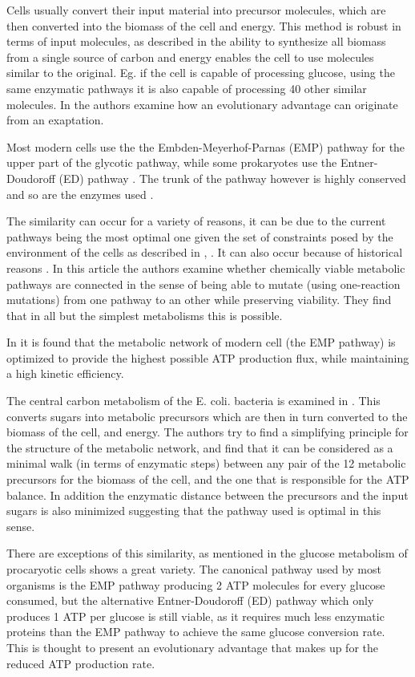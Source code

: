 \documentclass[10pt,a4paper]{article}
\begin{document}
	Cells usually convert their input material into precursor molecules, which are then converted into the biomass of the cell and energy. This method is robust in terms of input molecules, as described in \cite{latent} the ability to synthesize all biomass from a single source of carbon and energy enables the cell to use molecules similar to the original. Eg. if the cell is capable of processing glucose, using the same enzymatic pathways it is also capable of processing 40 other similar molecules.  In \cite{latent} the authors examine how an evolutionary advantage can originate from an exaptation. 
	
	  
	Most modern cells use the the Embden-Meyerhof-Parnas (EMP) pathway for the upper part of the glycotic  pathway, while some prokaryotes use the Entner-Doudoroff (ED) pathway \cite{EDpathway}. The trunk of the pathway however is highly conserved and so are the enzymes used \cite{latent}. 
	
	The similarity can occur for a variety of reasons, it can be due to the current pathways being the most optimal one given the set of constraints posed by the environment of the cells as described in \cite{theoretical}, \cite{central}. It can also occur because of historical reasons \cite{historical}. In this article the authors examine whether chemically viable metabolic pathways are connected in the sense of being able to mutate (using one-reaction mutations) from one pathway to an other while preserving viability. They find that in all but the simplest metabolisms this is possible.
	
	In \cite{theoretical} it is found that the metabolic network of modern cell (the EMP pathway) is optimized to provide the highest possible ATP production flux, while maintaining a high kinetic efficiency. 
	
	The central carbon metabolism of the E. coli. bacteria is examined in \cite{central}. This converts sugars into metabolic precursors which are then in turn converted to the biomass of the cell, and energy. The authors try to find a simplifying principle for the structure of the metabolic network, and find that it can be considered as a minimal walk (in terms of enzymatic steps) between any pair of the 12 metabolic precursors for the biomass of the cell, and the one that is responsible for the ATP balance. In addition the enzymatic distance between the precursors and the input sugars is also minimized suggesting that the pathway used is optimal in this sense. 
	
	There are exceptions of this similarity, as mentioned in \cite{strategy} the glucose metabolism of procaryotic cells shows a great variety. The canonical pathway used by most organisms is the EMP pathway producing 2 ATP molecules for every glucose consumed, but the alternative Entner-Doudoroff (ED) pathway which only produces 1 ATP per glucose is still viable, as it requires much less enzymatic proteins than the EMP pathway to achieve the same glucose conversion rate. This is thought to present an evolutionary advantage that makes up for the reduced ATP production rate. 
	
\end{document}
